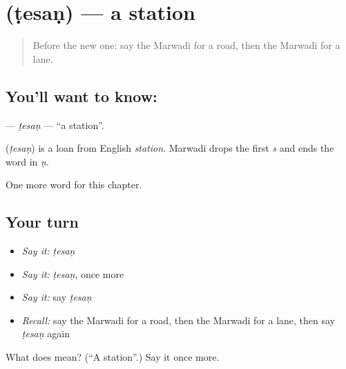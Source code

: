 \section[\texorpdfstring{\mw{टेसण} (ṭesaṇ)}{टेसण (ṭesaṇ)}]{ (ṭesaṇ) — a station}

\label{lesson:MW-C82-tesan}



\begin{quote}
Before the new one: say the Marwadi for a road, then the Marwadi for a lane.
\end{quote}

\subsection*{You'll want to know: }
\textbf{} — \emph{ṭesaṇ} — \textquotedblleft{}a station\textquotedblright{}.

\begin{cousinweb}
\textbf{} (\emph{ṭesaṇ}) is a loan from English \emph{station}. Marwadi drops the first \emph{s} and ends the word in \emph{ṇ}.
\end{cousinweb}

\begin{grammarlens}[title={What you've built}]
One more word for this chapter.
\end{grammarlens}

\subsection*{Your turn}
\begin{itemize}
\raggedright
  \item \emph{Say it:} \emph{ṭesaṇ}
  \item \emph{Say it:} \emph{ṭesaṇ}, once more
  \item \emph{Say it:} say \emph{ṭesaṇ}
  \item \emph{Recall:} say the Marwadi for a road, then the Marwadi for a lane, then say \emph{ṭesaṇ} again
\end{itemize}

\begin{tcolorbox}[breakable,colback=teal!4,colframe=teal!35!black,title={Before you move on}]
What does  mean? (\textquotedblleft{}A station\textquotedblright{}.) Say it once more.
\end{tcolorbox}

